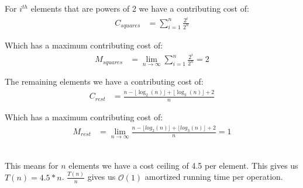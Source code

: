 \documentclass[12pt]{article}
\begin{document}
For $i^{th}$ elements that are powers of 2 we have a contributing cost of:
\begin{align} 
C_{squares} &= \sum_{i=1}^{n} \frac{2^i}{2^n}
\end{align}

Which has a maximum contributing cost of:
\begin{align}
M_{squares} &= \lim_{n \to \infty} \sum_{i=1}^{n} \frac{2^i}{2^n} = 2
\end{align}

The remaining elements we have a contributing cost of:
\begin{align}
C_{rest} &= \frac{n - \lfloor \log_{2}(n) \rfloor + \lfloor \log_{3}(n) \rfloor + 2}{n} 
\end{align}

Which has a maximum contributing cost of:
\begin{align}
M_{rest} &= \lim_{n \to \infty} \frac{n - \lfloor log_{2}(n) \rfloor + \lfloor log_{3}(n) \rfloor + 2}{n} = 1
\end{align} 

This means for $n$ elements we have a cost ceiling of 4.5 per element. This gives us $T(n) = 4.5*n$. $\frac{T(n)}{n}$ gives us $\mathcal{O}(1)$ amortized running time per operation.



\end{document}
